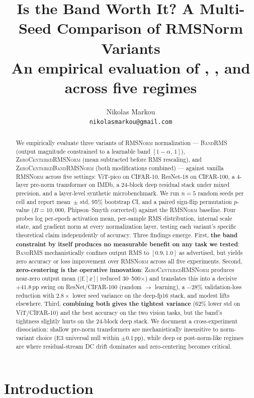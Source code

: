 \documentclass{article}
\title{Is the Band Worth It? A Multi-Seed Comparison of RMSNorm Variants\\
\large{An empirical evaluation of \bandrms{}, \zcrms{}, and \zcband{} across five regimes}}
\author{
  Nikolas Markou \\
  \texttt{nikolasmarkou@gmail.com}
}
\date{}
\newcommand{\E}{\mathbb{E}}
\newcommand{\rms}{\textsc{RMSNorm}}
\newcommand{\bandrms}{\textsc{BandRMS}}
\newcommand{\zcrms}{\textsc{ZeroCentered}\-\textsc{RMSNorm}}
\newcommand{\zcband}{\textsc{ZeroCentered}\-\textsc{BandRMSNorm}}
\begin{document}
\maketitle

\begin{abstract}
We empirically evaluate three variants of \rms{} normalization --- \bandrms{} (output magnitude constrained to a learnable band $[1-\alpha,\,1]$), \zcrms{} (mean subtracted before RMS rescaling), and \zcband{} (both modifications combined) --- against vanilla \rms{} across five settings: ViT-pico on CIFAR-10, ResNet-18 on CIFAR-100, a 4-layer pre-norm transformer on IMDb, a 24-block deep residual stack under mixed precision, and a layer-level synthetic microbenchmark.
We run $n{=}5$ random seeds per cell and report mean~$\pm$ std, 95\% bootstrap CI, and a paired sign-flip permutation $p$-value ($B{=}10{,}000$, Phipson--Smyth corrected) against the \rms{} baseline.
Four probes log per-epoch activation mean, per-sample RMS distribution, internal scale state, and gradient norm at every normalization layer, testing each variant's specific theoretical claim independently of accuracy.
Three findings emerge.
First, \textbf{the band constraint by itself produces no measurable benefit on any task we tested}: \bandrms{} mechanistically confines output RMS to $[0.9, 1.0]$ as advertised, but yields zero accuracy or loss improvement over \rms{} across all five experiments.
Second, \textbf{zero-centering is the operative innovation}: \zcrms{} produces near-zero output mean ($|\E[x]|$ reduced 30--500$\times$) and translates this into a decisive $+41.8$\,pp swing on ResNet/CIFAR-100 (random $\to$ learning), a $-28\%$ validation-loss reduction with $2.8\times$ lower seed variance on the deep-fp16 stack, and modest lifts elsewhere.
Third, \textbf{combining both gives the tightest variance} ($62\%$ lower std on ViT/CIFAR-10) and the best accuracy on the two vision tasks, but the band's tightness slightly hurts on the 24-block deep stack.
We document a cross-experiment dissociation: shallow pre-norm transformers are mechanistically insensitive to norm-variant choice (E3 universal null within $\pm 0.1$\,pp), while deep or post-norm-like regimes are where residual-stream DC drift dominates and zero-centering becomes critical.
\end{abstract}

\section{Introduction}
\label{sec:intro}
\end{document}
